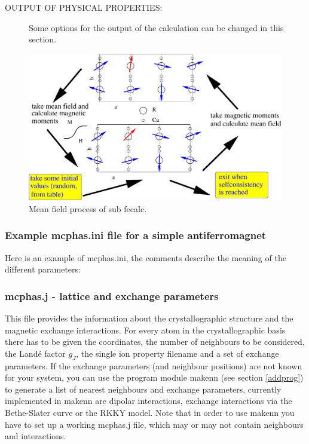 \begin{description}
\item [OUTPUT OF PHYSICAL PROPERTIES:]
Some options for the output of the calculation can be changed in this section.
\end{description}

\begin{figure}[hb]
\includegraphics[angle=0,width=0.9\columnwidth]{figsrc/fecalc.eps}
\caption{\label{fecalc}Mean field process of sub {\prg fecalc}.}
\end{figure}

 
\subsubsection{Example {\prg mcphas.ini} file for a simple antiferromagnet}

Here is an example of {\prg mcphas.ini}, the comments describe the meaning of the different
parameters:





\subsubsection{{\prg mcphas.j} - lattice and exchange parameters}\label{mcphasj}
This file provides the information about 
the crystallographic
 structure and the magnetic exchange interactions.
For every atom in the crystallographic basis there
has to be given the coordinates, the number of neighbours to be considered, the 
Land\'e factor $g_J$, the single ion property filename and  a set of exchange parameters.
If the exchange parameters (and neighbour positions) are not known for your system, you 
can use the program module {\prg makenn} (see section \ref{addprog}) to generate 
a list of nearest neighbours and
exchange parameters, currently implemented in {\prg makenn} are dipolar interactions,
exchange interactions via the Bethe-Slater curve or the RKKY model. Note that in order
to use {\prg makenn} you have to set up a working {\prg mcphas.j} file, which may or
may not contain neighbours and interactions.

